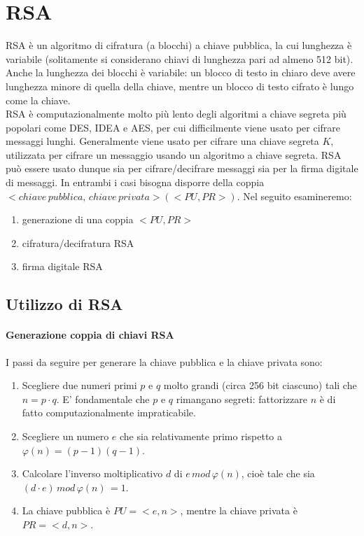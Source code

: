 \section{RSA}

RSA è un algoritmo di cifratura (a blocchi) a chiave pubblica, la cui lunghezza è variabile (solitamente si considerano chiavi di lunghezza pari ad almeno 512 bit). Anche la lunghezza dei blocchi è variabile: un blocco di testo in chiaro deve avere lunghezza minore di quella della chiave, mentre un blocco di testo cifrato è lungo come la chiave. \\
RSA è computazionalmente molto più lento degli algoritmi a chiave segreta più popolari come DES, IDEA e AES, per cui difficilmente viene usato per cifrare messaggi lunghi. Generalmente viene usato per cifrare una chiave segreta $K$, utilizzata per cifrare un messaggio usando un algoritmo a chiave segreta. RSA può essere usato dunque sia per cifrare/decifrare messaggi sia per la firma digitale di messaggi. In entrambi i casi bisogna disporre della coppia $<chiave \, pubblica, \,  chiave \, privata>(<PU,PR>)$. Nel seguito esamineremo:
\begin{enumerate}
\item generazione di una coppia $<PU,PR>$
\item cifratura/decifratura RSA
\item firma digitale RSA
\end{enumerate}

\subsection{Utilizzo di RSA} \label{sec:ut_rsa}

\paragraph{Generazione coppia di chiavi RSA}
I passi da seguire per generare la chiave pubblica e la chiave privata sono: 
\begin{enumerate}
\item Scegliere due numeri primi $p$ e $q$ molto grandi (circa 256 bit ciascuno) tali che $n = p \cdot q$. E' fondamentale che $p$ e $q$ rimangano segreti: fattorizzare $n$ è di fatto computazionalmente impraticabile. 
\item Scegliere un numero $e$ che sia relativamente primo rispetto a $\varphi(n) = (p-1)(q-1)$.
\item Calcolare l'inverso moltiplicativo $d$ di $e \, mod \, \varphi(n)$, cioè tale che sia $(d \cdot e ) \, mod \, \varphi(n) \, = 1$.
\item La chiave pubblica è $PU = <e,n>$, mentre la chiave privata è $PR = <d,n>$.
\end{enumerate}

